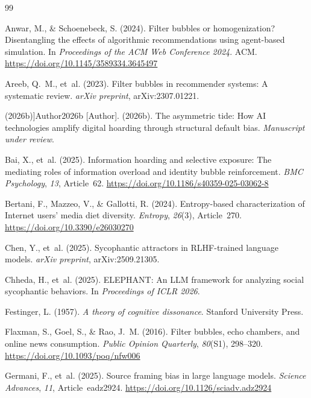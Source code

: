 \documentclass[12pt,a4paper]{article}
\begin{document}

\begin{thebibliography}{99}

Anwar, M., \& Schoenebeck, S. (2024).
Filter bubbles or homogenization? Disentangling the effects of algorithmic recommendations using agent-based simulation.
In \emph{Proceedings of the ACM Web Conference 2024}. ACM.
\url{https://doi.org/10.1145/3589334.3645497}

Areeb, Q.~M., et~al. (2023).
Filter bubbles in recommender systems: A systematic review.
\emph{arXiv preprint}, arXiv:2307.01221.

\bibitem[[Author](2026b)]{Author2026b}
[Author]. (2026b).
The asymmetric tide: How AI technologies amplify digital hoarding through structural default bias.
\emph{Manuscript under review}.

Bai, X., et~al. (2025).
Information hoarding and selective exposure: The mediating roles of information overload and identity bubble reinforcement.
\emph{BMC Psychology}, \emph{13}, Article~62.
\url{https://doi.org/10.1186/s40359-025-03062-8}

Bertani, F., Mazzeo, V., \& Gallotti, R. (2024).
Entropy-based characterization of Internet users' media diet diversity.
\emph{Entropy}, \emph{26}(3), Article~270.
\url{https://doi.org/10.3390/e26030270}

Chen, Y., et~al. (2025).
Sycophantic attractors in RLHF-trained language models.
\emph{arXiv preprint}, arXiv:2509.21305.

Chheda, H., et~al. (2025).
ELEPHANT: An LLM framework for analyzing social sycophantic behaviors.
In \emph{Proceedings of ICLR 2026}.

Festinger, L. (1957).
\emph{A theory of cognitive dissonance}.
Stanford University Press.

Flaxman, S., Goel, S., \& Rao, J.~M. (2016).
Filter bubbles, echo chambers, and online news consumption.
\emph{Public Opinion Quarterly}, \emph{80}(S1), 298--320.
\url{https://doi.org/10.1093/poq/nfw006}

Germani, F., et~al. (2025).
Source framing bias in large language models.
\emph{Science Advances}, \emph{11}, Article~eadz2924.
\url{https://doi.org/10.1126/sciadv.adz2924}


\end{thebibliography}
\end{document}
